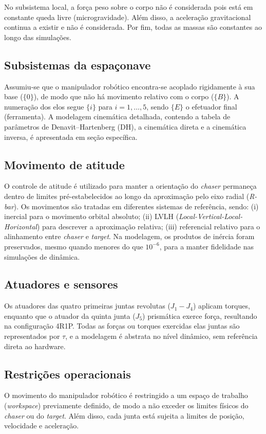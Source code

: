 No subsistema local, a força peso sobre o corpo não é considerada pois está em constante queda livre (microgravidade).
Além disso, a aceleração gravitacional continua a existir e não é considerada.
Por fim, todas as massas são constantes ao longo das simulações.

\subsection{Subsistemas da espaçonave}
Assumiu-se que o manipulador robótico encontra-se acoplado rigidamente à sua base ($\{0\}$), de modo que não há movimento relativo com o corpo ($\{B\}$).
A numeração dos elos segue $\{i\}$ para $i=1,\dots,5$, sendo $\{E\}$ o efetuador final (ferramenta).
A modelagem cinemática detalhada, contendo a tabela de parâmetros de Denavit--Hartenberg (DH), a cinemática direta e a cinemática inversa, é apresentada em seção específica.

\subsection{Movimento de atitude}
O controle de atitude é utilizado para manter a orientação do \emph{chaser} permaneça dentro de limites pré-estabelecidos ao longo da aproximação pelo eixo radial (\emph{R-bar}).
Os movimentos são tratadas em diferentes sistemas de referência, sendo:
(i) inercial para o movimento orbital absoluto;
(ii) LVLH (\emph{Local-Vertical-Local-Horizontal}) para descrever a aproximação relativa;
(iii) referencial relativo para o alinhamento entre \emph{chaser} e \emph{target}.
Na modelagem, os produtos de inércia foram preservados, mesmo quando menores do que $10^{-6}$, para a manter fidelidade nas simulações de dinâmica.

\subsection{Atuadores e sensores}
Os atuadores das quatro primeiras juntas revolutas ($J_1 - J_4$) aplicam torques, enquanto que o atuador da quinta junta ($J_5$) prismática exerce força, resultando na configuração 4R1P.
Todas as forças ou torques exercidas elas juntas são representados por $\tau$, e a modelagem é abstrata no nível dinâmico, sem referência direta ao hardware.

\subsection{Restrições operacionais}
O movimento do manipulador robótico é restringido a um espaço de trabalho (\emph{workspace}) previamente definido, de modo a não exceder os limites físicos do \emph{chaser} ou do \emph{target}.
Além disso, cada junta está sujeita a limites de posição, velocidade e aceleração.

